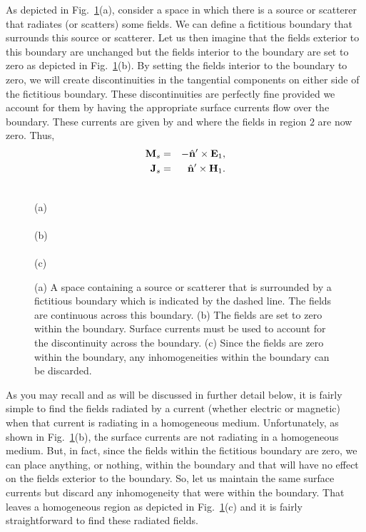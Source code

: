 As depicted in Fig.\ \ref{fig:equivalence}(a), consider a space in
which there is a source or scatterer that radiates (or scatters) some
fields.  We can define a fictitious boundary that surrounds this
source or scatterer.  Let us then imagine that the fields exterior to
this boundary are unchanged but the fields interior to the boundary
are set to zero as depicted in Fig.\ \ref{fig:equivalence}(b).  By
setting the fields interior to the boundary to zero, we will create
discontinuities in the tangential components on either side of the
fictitious boundary.  These discontinuities are perfectly fine provided
we account for them by having the appropriate surface currents flow
over the boundary.  These currents are given by
 and  where the fields in
region $2$ are now zero.  Thus,
\begin{eqnarray}
  \mathbf{M}_s &=& -\hat{\mathbf{n}}'\times\mathbf{E}_1, \\
  \mathbf{J}_s &=& \hat{\mathbf{n}}'\times\mathbf{H}_1.
\end{eqnarray}

\begin{figure}
  \begin{center}
  \\
   (a)\\
  \\
   (b)\\
  \\
   (c)
  \end{center}
  \caption{(a) A space containing a source or scatterer that is
  surrounded by a fictitious boundary which is indicated by the dashed
  line.  The fields are continuous across this boundary.  (b) The
  fields are set to zero within the boundary.  Surface currents must
  be used to account for the discontinuity across the boundary.  (c)
  Since the fields are zero within the boundary, any inhomogeneities
  within the boundary can be discarded.}  \label{fig:equivalence}
\end{figure}

As you may recall and as will be discussed in further detail below, it
is fairly simple to find the fields radiated by a current (whether
electric or magnetic) when that current is radiating in a homogeneous
medium.  Unfortunately, as shown in Fig.\ \ref{fig:equivalence}(b),
the surface currents are not radiating in a homogeneous medium.  But,
in fact, since the fields within the fictitious boundary are zero, we
can place anything, or nothing, within the boundary and that will have
no effect on the fields exterior to the boundary.  So, let us maintain
the same surface currents but discard any inhomogeneity that were
within the boundary.  That leaves a homogeneous region as depicted in 
Fig.\ \ref{fig:equivalence}(c) and it is fairly straightforward to find
these radiated fields.

